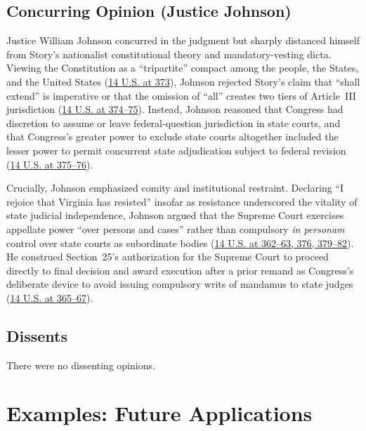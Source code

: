 \documentclass[12pt]{article}
\begin{document}
\subsection{Concurring Opinion (Justice Johnson)}

Justice William Johnson concurred in the judgment but sharply distanced himself from Story's nationalist constitutional theory and mandatory-vesting dicta. Viewing the Constitution as a ``tripartite'' compact among the people, the States, and the United States (\href{https://supreme.justia.com/cases/federal/us/14/304/}{14 U.S. at 373}), Johnson rejected Story's claim that ``shall extend'' is imperative or that the omission of ``all'' creates two tiers of Article~III jurisdiction (\href{https://supreme.justia.com/cases/federal/us/14/304/}{14 U.S. at 374--75}). Instead, Johnson reasoned that Congress had discretion to assume or leave federal-question jurisdiction in state courts, and that Congress's greater power to exclude state courts altogether included the lesser power to permit concurrent state adjudication subject to federal revision (\href{https://supreme.justia.com/cases/federal/us/14/304/}{14 U.S. at 375--76}).

Crucially, Johnson emphasized comity and institutional restraint. Declaring ``I rejoice that Virginia has resisted'' insofar as resistance underscored the vitality of state judicial independence, Johnson argued that the Supreme Court exercises appellate power ``over persons and cases'' rather than compulsory \textit{in personam} control over state courts as subordinate bodies (\href{https://supreme.justia.com/cases/federal/us/14/304/}{14 U.S. at 362--63, 376, 379--82}). He construed Section~25's authorization for the Supreme Court to proceed directly to final decision and award execution after a prior remand as Congress's deliberate device to avoid issuing compulsory writs of mandamus to state judges (\href{https://supreme.justia.com/cases/federal/us/14/304/}{14 U.S. at 365--67}).

\subsection{Dissents}

There were no dissenting opinions.

\section{Examples: Future Applications}
\end{document}
